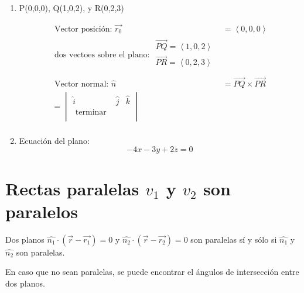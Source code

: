 \begin{enumerate}
    
    \item P(0,0,0), Q(1,0,2), y R(0,2,3)
        \begin{center}
            \begin{align*}
                \text{  Vector posición: } \vec{r_0} & = \left\langle 0,0,0 \right\rangle \\ 
                  \text{ dos  vectoes sobre el plano:  } \begin{matrix*}
                     \vec{PQ} = \left\langle 1,0,2 \right\rangle \\ 
                     \vec{PR} = \left\langle 0,2,3 \right\rangle  \\ 
                 \end{matrix*} \\ 
                \text{  Vector normal:  } \hat{n} & = \overrightarrow{PQ} \times  \overrightarrow{PR} \\ 
                  = \begin{vmatrix}
                     \hat{i} & \hat{j} & \hat{k} \\
                      \text{  terminar  } \\
                 \end{vmatrix} \\
            \end{align*}
        \end{center}
    
    \item Ecuación del plano:
    \[
      -4x-3y+2z=0
    \]
\end{enumerate}

 \section{Rectas paralelas $v_1$ y $v_2$ son paralelos}
Dos planos $\hat{n_1} \cdot (\vec{r}- \vec{r_1})= 0$ y $\hat{n_2} \cdot ( \vec{r}- \vec{r_2}) = 0$ son paralelas sí y sólo si $\hat{n_1}$ y $\hat{n_2}$ son paralelas.

 En caso que no sean paralelas, se puede encontrar el ángulos de intersección entre dos planos.


























